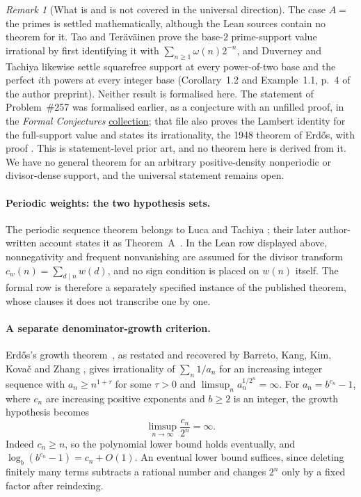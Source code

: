 \documentclass[11pt]{article}
\theoremstyle{plain}
\theoremstyle{definition}
\theoremstyle{remark}
\newtheorem{rem}[thm]{Remark}
\let\origtexttt\texttt
\renewcommand{\texttt}[1]{\origtexttt{\seqsplit{#1}}}%
\begin{document}
\begin{rem}[What is and is not covered in the universal direction]
The case $A=$ the primes is settled mathematically, although the Lean
sources contain no theorem for it. Tao and Ter\"av\"ainen prove the
base-$2$ prime-support value irrational by first identifying it with
$\sum_{n\ge1}\omega(n)2^{-n}$, and Duverney and Tachiya likewise settle
squarefree support at every power-of-two base and the perfect $i$th
powers at every integer base (Corollary~1.2 and Example~1.1, p.~4 of the
author preprint). Neither result is formalised here. The statement of
Problem~\#257 was formalised earlier, as a conjecture with an unfilled
proof, in the \emph{Formal Conjectures}
\href{https://github.com/google-deepmind/formal-conjectures/blob/f776d2f2039351b00737ffcafb9d7d7666e1d9af/FormalConjectures/ErdosProblems/257.lean}{collection};
that file also proves the Lambert identity for the full-support value and
states its irrationality, the 1948 theorem of Erd\H{o}s, with proof
\texttt{sorry}. This is statement-level prior art, and no theorem here is
derived from it. We have no general theorem for an arbitrary
positive-density nonperiodic or divisor-dense support, and the universal
statement remains open.
\end{rem}

\paragraph{Periodic weights: the two hypothesis sets.}
The periodic sequence theorem belongs to Luca and Tachiya
\cite{lucatachiya2014periodic}; their later author-written account states
it as Theorem~A~\cite[p.~139]{lucatachiya2017}. In the Lean row displayed
above, nonnegativity and frequent nonvanishing are assumed for the divisor
transform $c_w(n)=\sum_{d\mid n}w(d)$, and no sign condition is placed on
$w(n)$ itself. The formal row is therefore a separately specified instance
of the published theorem, whose clauses it does not transcribe one by
one.

\paragraph{A separate denominator-growth criterion.}
Erd\H{o}s's growth theorem~\cite{erdos1975}, as restated and recovered
by Barreto, Kang, Kim, Kova\v{c} and Zhang
\cite[Remark~4(4), p.~5]{bkkkz2026}, gives irrationality of
$\sum_n1/a_n$ for an increasing integer sequence with
$a_n\ge n^{1+\tau}$ for some $\tau>0$ and
$\limsup_n a_n^{1/2^n}=\infty$.  For $a_n=b^{c_n}-1$, where
$c_n$ are increasing positive exponents and $b\ge2$ is an integer,
the growth hypothesis becomes
\[
 \limsup_{n\to\infty}\frac{c_n}{2^n}=\infty.
\]
Indeed $c_n\ge n$, so the polynomial lower bound holds eventually,
and $\log_b(b^{c_n}-1)=c_n+O(1)$. An eventual lower bound suffices,
since deleting finitely many terms subtracts a rational number and changes
$2^n$ only by a fixed factor after reindexing.
\end{document}
